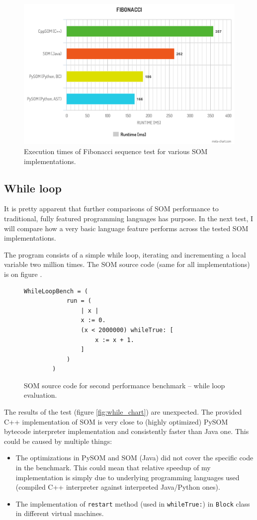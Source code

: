 \documentclass[thesis=M,english]{FITthesis}[2019/12/23]
\begin{document}
\begin{figure}
	\centering
	\includegraphics[width=\textwidth]{media/fib_chart_2.png}
	\caption{Execution times of Fibonacci sequence test for various SOM implementations.}
	\label{fig:fib_chart_2}
\end{figure}

\subsection{While loop}
It is pretty apparent that further comparisons of SOM performance to traditional, fully featured programming languages has purpose. In the
next test, I will compare how a very basic language feature performs across the tested SOM implementations.

The program consists of a simple while loop, iterating and incrementing a local variable two million times. The SOM source code (same for all
implementations) is on figure .
\begin{figure}[h!]
	\centering
	\begin{lstlisting}[language=Smalltalk]
		WhileLoopBench = (
			run = (
				| x |
				x := 0.
				(x < 2000000) whileTrue: [
					x := x + 1.
				]
			)
		)
	\end{lstlisting}
	\caption{SOM source code for second performance benchmark -- while loop evaluation.}
	\label{fig:code_while_bench}
\end{figure}

The results of the test (figure \ref{fig:while_chart}) are unexpected. The provided C++ implementation of SOM is very close to (highly optimized) PySOM bytecode interpreter
implementation and consistently faster than Java one. This could be caused by multiple things:
\begin{itemize}
	\item The optimizations in PySOM and SOM (Java) did not cover the specific code in the benchmark. This could mean that relative speedup of my implementation is simply
		due to underlying programming languages used (compiled C++ interpreter against interpreted Java/Python ones).
	\item The implementation of \texttt{restart} method (used in \texttt{whileTrue:}) in \texttt{Block} class in different virtual machines.
\end{itemize} 
\end{document}
